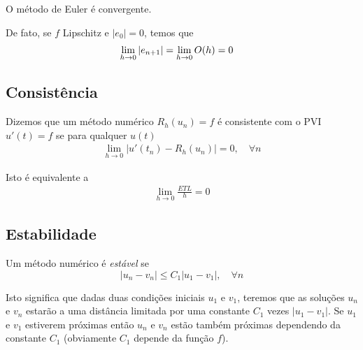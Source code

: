 \begin{teo}
O método de Euler é convergente.
\end{teo}

De fato, se $f$ Lipschitz e $|e_0|=0$, temos que
\begin{eqnarray}
 \lim_{h\rightarrow 0} |e_{n+1}|  &= \lim_{h\rightarrow 0} \mathcal \mathcal{O}(h) = 0
\end{eqnarray}


\subsection{Consistência}
\begin{defn}
Dizemos que um método numérico $R_h(u_n)=f$ é consistente com o PVI $u'(t)=f$ se para qualquer $u(t)$
\begin{eqnarray}
  \lim_{h \rightarrow 0} |u'(t_n)-R_h(u_n)| = 0, \quad  \forall n
\end{eqnarray}
\end{defn}

Isto é equivalente a
\begin{eqnarray}
  \lim_{h \rightarrow 0} \frac{ETL}{h} = 0
\end{eqnarray}



%
%

\subsection{Estabilidade}
\begin{defn}
Um método numérico é \emph{estável} se
$$ |u_n-v_n| \leq  C_1|u_1-v_1|, \quad  \forall n$$
\end{defn}
Isto significa que dadas duas condições iniciais $u_1$ e $v_1$, teremos que as soluções $u_n$ e $v_n$ estarão a uma distância limitada  por uma constante $C_1$ vezes $|u_1-v_1|$. Se $u_1$ e $v_1$ estiverem próximas então $u_n$ e $v_n$ estão também próximas dependendo da constante $C_1$ (obviamente $C_1$ depende da função $f$).


